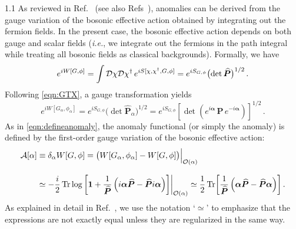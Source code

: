 \documentclass[a4paper,12pt]{article}
\def\O{{\cal O}}
\def\Dcal{{\cal D}}
\def\Acal{{\cal A}}
\def\ie{\emph{i.e.}}
\def\mat#1{\boldsymbol{#1}}
\def\X{\mat{\widehat{P}}}
\def\alphamat{\mat{\alpha}}
\begin{document}
\begin{spacing}{1.1}
As reviewed in Ref.~\cite{Paper1} (see also Refs~\cite{Bertlmann:1996xk,Bilal:2008qx}), anomalies can be derived from the gauge variation of the bosonic effective action obtained by integrating out the fermion fields. In the present case, the bosonic effective action depends on both gauge and scalar fields (\ie, we integrate out the fermions in the path integral while treating all bosonic fields as classical backgrounds). Formally, we have
\begin{equation}
e^{iW[G, \phi]} = \int \Dcal \chi \Dcal \chi^\dagger\, e^{iS[\chi, \chi^\dagger, G, \phi]}
= e^{iS_{G,\phi}} \bigl(\det\X\bigr)^{1/2} \,.
\end{equation}
Following \cref{eqn:GTX}, a gauge transformation yields
\begin{equation}
e^{iW[G_\alpha, \phi_\alpha]}
= e^{iS_{G,\phi}} \bigl(\det \X_\alpha \bigr)^{1/2}
= e^{iS_{G,\phi}} \left[ \det\left( e^{i\alphamat}\, \X \, e^{-i\alphamat} \right) \right]^{1/2} \,.
\end{equation}
As in \cref{eqn:defineanomaly}, the anomaly functional (or simply the anomaly) is defined by the first-order gauge variation of the bosonic effective action:
\begin{align}
\Acal [\alpha] &\equiv \delta_\alpha W[G,\phi]
=\bigl( W[G_\alpha, \phi_\alpha] - W[G,\phi] \bigr) \Bigr|_{\O(\alpha)}
\notag\\[8pt]
& \simeq -\frac{i}{2} \Tr\log \bigg[ \mat{1} + \frac{1}{\X} \,\Bigl(i\alphamat \X - \X i\alphamat \Bigr) \bigg] \biggr|_{\O(\alpha)}
\simeq \frac12 \Tr \biggl[ \frac{1}{\X} \,\Bigl(\alphamat \X - \X \alphamat \Bigr) \biggr] \,.
\label{eq:anomaly_unregularized}
\end{align}
As explained in detail in Ref.~\cite{Paper1}, we use the notation `$\simeq$' to emphasize that the expressions are not exactly equal unless they are regularized in the same way.


\end{spacing}
\end{document}
